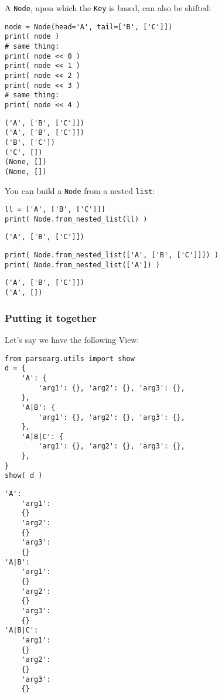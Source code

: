 \documentclass[10pt]{amsart}
\numberwithin{equation}{section}
\begin{document}
A \texttt{Node}, upon which the \texttt{Key} is based, can also be shifted:
\begin{verbatim}
node = Node(head='A', tail=['B', ['C']])
print( node )
# same thing:
print( node << 0 )
print( node << 1 )
print( node << 2 )
print( node << 3 )
# same thing:
print( node << 4 )
\end{verbatim}

\begin{verbatim}
('A', ['B', ['C']])
('A', ['B', ['C']])
('B', ['C'])
('C', [])
(None, [])
(None, [])
\end{verbatim}


You can build a \texttt{Node} from a nested \texttt{list}:
\begin{verbatim}
ll = ['A', ['B', ['C']]]
print( Node.from_nested_list(ll) )
\end{verbatim}

\begin{verbatim}
('A', ['B', ['C']])
\end{verbatim}


\begin{verbatim}
print( Node.from_nested_list(['A', ['B', ['C']]]) )
print( Node.from_nested_list(['A']) )
\end{verbatim}

\begin{verbatim}
('A', ['B', ['C']])
('A', [])
\end{verbatim}

\subsubsection{Putting it together}
\label{sec:org41fed46}
Let's say we have the following View:
\begin{verbatim}
from parsearg.utils import show
d = {
    'A': {
        'arg1': {}, 'arg2': {}, 'arg3': {},
    },
    'A|B': {
        'arg1': {}, 'arg2': {}, 'arg3': {},
    },
    'A|B|C': {
        'arg1': {}, 'arg2': {}, 'arg3': {},
    },
}
show( d )
\end{verbatim}

\begin{verbatim}
'A':
    'arg1':
    {}
    'arg2':
    {}
    'arg3':
    {}
'A|B':
    'arg1':
    {}
    'arg2':
    {}
    'arg3':
    {}
'A|B|C':
    'arg1':
    {}
    'arg2':
    {}
    'arg3':
    {}
\end{verbatim}
\end{document}
